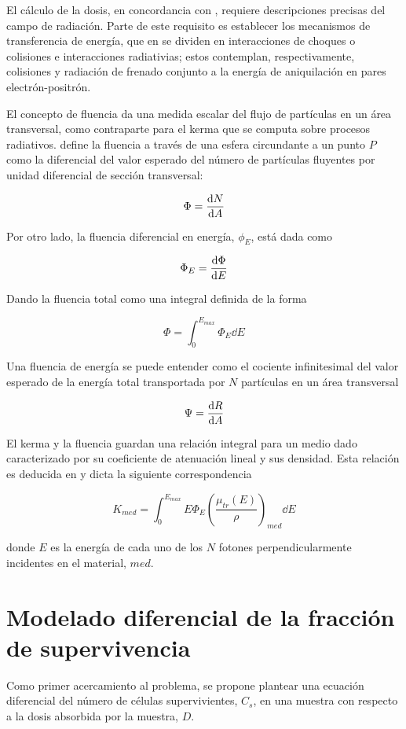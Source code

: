 \documentclass[12pt,letterpaper, oneside]{book}
\begin{document}
	El cálculo de la dosis, en concordancia con \cite{Mayles.2007}, requiere descripciones precisas del campo de radiación. Parte de este requisito es establecer los mecanismos de transferencia de energía, que en \cite{IAEA.2005} se dividen en interacciones de choques o colisiones e interacciones radiativias; estos contemplan, respectivamente, colisiones y radiación de frenado conjunto a la energía de aniquilación en pares electrón-positrón. 
	
	El concepto de fluencia da una medida escalar del flujo de partículas en un área transversal, como contraparte para el kerma que se computa sobre procesos radiativos\cite{IAEA.2005}. \cite{Mayles.2007} define la fluencia a través de una esfera circundante a un punto $P$ como la diferencial del valor esperado del número de partículas fluyentes por unidad diferencial de sección transversal:
	
	$$\Phi=\dv{N}{A}$$
	
	Por otro lado, la fluencia diferencial en energía, $\phi_E$, está dada como
	
	$$\Phi_E=\dv{\Phi}{E}$$
	
	Dando la fluencia total como una integral definida de la forma
	
	$$\Phi=\int_{0}^{E_{max}}\Phi_E \dd{E}$$
	
	Una fluencia de energía se puede entender como el cociente infinitesimal del valor esperado de la energía total transportada por $N$ partículas en un área transversal
	
	$$\Psi=\dv{R}{A}$$
	
	El kerma y la fluencia guardan una relación integral para un medio dado caracterizado por su coeficiente de atenuación lineal y sus densidad. Esta relación es deducida en \cite{Mayles.2007} y dicta la siguiente correspondencia
	
	\begin{equation}
		K_{med}=\int_{0}^{E_{max}} E\Phi_E\left(\frac{\mu_{tr}(E)}{\rho}\right)_{med}\dd{E} \label{kerma_fluencia}
	\end{equation}
	
	donde $E$ es la energía de cada uno de los $N$ fotones perpendicularmente incidentes en el material, $med$. 
	
	\section{Modelado diferencial de la fracción de supervivencia}
	Como primer acercamiento al problema, se propone plantear una ecuación diferencial del número de células supervivientes, $C_s$, en una muestra con respecto a la dosis absorbida por la muestra, $D$.
	
\end{document}
